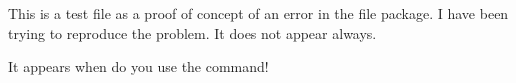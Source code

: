\documentclass{article}
\begin{document}
This is a test file as a proof of concept of an error in the file package.
I have been trying to reproduce the problem. It does not appear always.

It appears when do you use the \bibliograhpy command!


\end{document}
